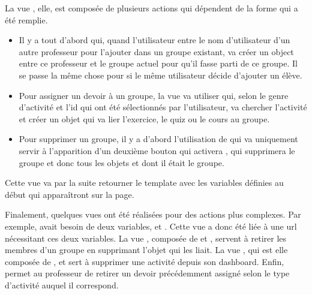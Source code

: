 \documentclass[letterpaper,10pt,french]{sphinxmanual}
\begin{document}
La vue , elle, est composée de plusieurs actions qui dépendent de la
forme qui a été remplie.
\begin{itemize}
\item {} 
Il y a tout d'abord  qui, quand l'utilisateur entre le nom
d'utilisateur d'un autre professeur pour l'ajouter dans un groupe existant,
va créer un object  entre ce professeur et le groupe actuel
pour qu'il fasse parti de ce groupe. Il se passe la même chose pour
 si le même utilisateur décide d'ajouter un élève.

\item {} 
Pour assigner un devoir à un groupe, la vue va utiliser 
qui, selon le genre d'activité et l'id qui ont été sélectionnés par
l'utilisateur, va chercher l'activité et créer un objet 
qui va lier l'exercice, le quiz ou le cours au groupe.

\item {} 
Pour supprimer un groupe, il y a d'abord l'utilisation de 
qui va uniquement servir à l'apparition d'un deuxième bouton qui activera
, qui supprimera le groupe et donc tous les objets
 et  dont il était le groupe.

\end{itemize}

Cette vue va par la suite retourner le template  avec les
variables définies au début qui apparaîtront sur la page.

Finalement, quelques vues ont été réalisées pour des actions plus complexes.
Par exemple,  avait besoin de deux variables, 
et . Cette vue a donc été liée à une url nécessitant ces deux
variables. La vue , composée de  et
, servent à retirer les membres d'un groupe en supprimant
l'objet  qui les liait. La vue , qui est elle
composée de ,  et  sert à
supprimer une activité depuis son dashboard. Enfin,  permet
au professeur de retirer un devoir précédemment assigné selon le type d'activité
auquel il correspond.
\end{document}
